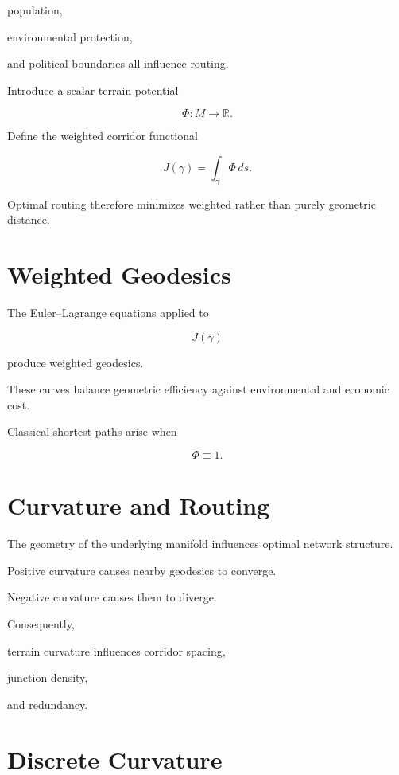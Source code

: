 \documentclass[11pt,fleqn]{book}
\numberwithin{equation}{chapter}
\theoremstyle{plain}
\theoremstyle{definition}
\theoremstyle{remark}
\begin{document}
population,

environmental protection,

and political boundaries all influence routing.

Introduce a scalar terrain potential

\[
\Phi:M\rightarrow\mathbb R.
\]

Define the weighted corridor functional

\[
J(\gamma)
=
\int_\gamma
\Phi\,ds.
\]

Optimal routing therefore minimizes weighted rather than purely
geometric distance.


\section{Weighted Geodesics}

The Euler--Lagrange equations applied to

\[
J(\gamma)
\]

produce weighted geodesics.

These curves balance geometric efficiency against environmental and
economic cost.

Classical shortest paths arise when

\[
\Phi\equiv1.
\]


\section{Curvature and Routing}

The geometry of the underlying manifold influences optimal network
structure.

Positive curvature causes nearby geodesics to converge.

Negative curvature causes them to diverge.

Consequently,

terrain curvature influences corridor spacing,

junction density,

and redundancy.


\section{Discrete Curvature}
\end{document}
